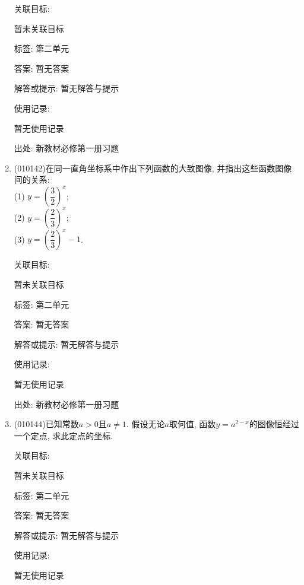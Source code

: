 \documentclass[10pt,a4paper]{article}
\begin{document}
\begin{enumerate}[1.]
关联目标:

暂未关联目标



标签: 第二单元

答案: 暂无答案

解答或提示: 暂无解答与提示

使用记录:

暂无使用记录


出处: 新教材必修第一册习题
\item { (010142)}在同一直角坐标系中作出下列函数的大致图像, 并指出这些函数图像间的关系:\\
(1) $y=(\dfrac 32)^x$;\\
(2) $y=(\dfrac 23)^x$;\\
(3) $y=(\dfrac 23)^x-1$.


关联目标:

暂未关联目标



标签: 第二单元

答案: 暂无答案

解答或提示: 暂无解答与提示

使用记录:

暂无使用记录


出处: 新教材必修第一册习题
\item { (010144)}已知常数$a>0$且$a\ne 1$. 假设无论$a$取何值, 函数$y=a^{2-x}$的图像恒经过一个定点, 求此定点的坐标.


关联目标:

暂未关联目标



标签: 第二单元

答案: 暂无答案

解答或提示: 暂无解答与提示

使用记录:

暂无使用记录



\end{enumerate}
\end{document}
